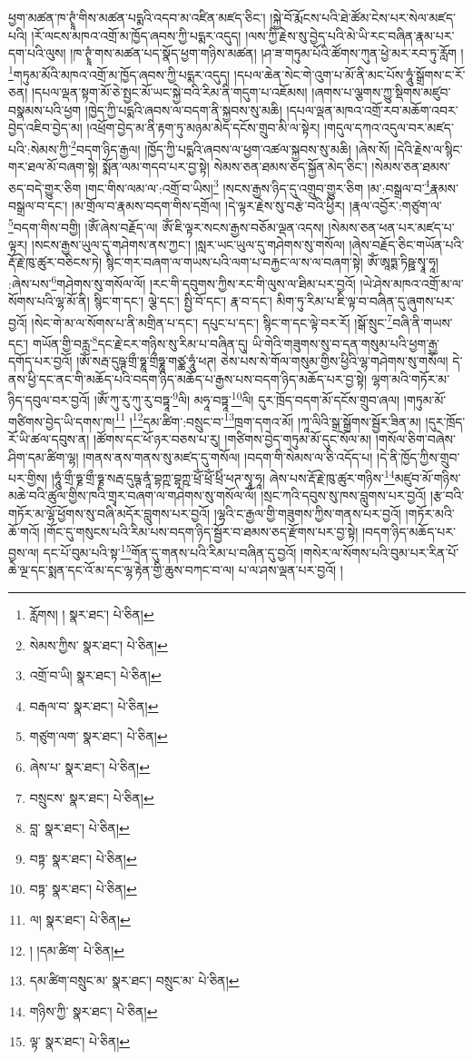 ཕྱག་མཚན་ཁ་ཊྭཱཾ་གིས་མཚན་པདྨའི་འདབ་མ་འཛིན་མཛད་ཅིང་། །སྐྱེ་བོ་རྨོངས་པའི་ཐེ་ཚོམ་ངེས་པར་སེལ་མཛད་པའི། །རོ་ལངས་མཁའ་འགྲོ་མ་ཁྱོད་ཞབས་ཀྱི་པདྨར་འདུད། །ལས་ཀྱི་རྗེས་སུ་བྱེད་པའི་མེ་ཡི་རང་བཞིན་རྣམ་པར་དག་པའི་ལུས། །ཁ་ཊྭཱཾ་གས་མཚན་པད་སྣོད་ཕྱག་གཉིས་མཚན། །ཤ་ཟ་གཏུམ་པོའི་ཚོགས་ཀུན་ཕྱེ་མར་རབ་ཏུ་རློག །\footnote{རློགས། །  སྣར་ཐང་།  པེ་ཅིན། }གཏུམ་མོའི་མཁའ་འགྲོ་མ་ཁྱོད་ཞབས་ཀྱི་པདྨར་འདུད། །དཔལ་ཆེན་སེང་གེ་འུག་པ་མོ་ནི་མང་པོས་ཧཱུཾ་སྒྲོགས་ང་རོ་ཅན། །དཔལ་ལྡན་སྟག་མོ་ཅེ་སྤྱང་མོ་ཡང་སྐྱེ་བའི་རིམ་ནི་གདུག་པ་འཇོམས། །ཞགས་པ་ལྕགས་ཀྱུ་སྡིགས་མཛུབ་བསྣམས་པའི་ཕྱག །ཁྱེད་ཀྱི་པདྨའི་ཞབས་ལ་བདག་ནི་སྐྱབས་སུ་མཆི། །དཔལ་ལྡན་མཁའ་འགྲོ་རབ་མཆོག་འབར་བྱེད་འཇིབ་བྱེད་མ། །འཕྲོག་བྱེད་མ་ནི་རྟག་ཏུ་མཉམ་མེད་དངོས་གྲུབ་མི་ལ་སྟེར། །གདུལ་དཀའ་འདུལ་བར་མཛད་པའི་:སེམས་ཀྱི་\footnote{སེམས་ཀྱིས་  སྣར་ཐང་།  པེ་ཅིན། }བདག་ཉིད་རྒྱལ། །ཁྱོད་ཀྱི་པདྨའི་ཞབས་ལ་ཕྱག་འཚལ་སྐྱབས་སུ་མཆི། །ཞེས་སོ། །དེའི་རྗེས་ལ་སྙིང་གར་ཐལ་མོ་བཞག་སྟེ། སྨོན་ལམ་གདབ་པར་བྱ་སྟེ། སེམས་ཅན་ཐམས་ཅད་སྐྱོན་མེད་ཅིང་། །སེམས་ཅན་ཐམས་ཅད་བདེ་གྱུར་ཅིག །གང་གིས་ལམ་ལ་:འགྲོ་བ་ཡིས།\footnote{འགྲོ་བ་ཡི།  སྣར་ཐང་།  པེ་ཅིན། } །སངས་རྒྱས་ཉིད་དུ་འགྲུབ་གྱུར་ཅིག །མ་:བསྒྲལ་བ་\footnote{བརྒལ་བ་  སྣར་ཐང་།  པེ་ཅིན། }རྣམས་བསྒྲལ་བ་དང་། །མ་གྲོལ་བ་རྣམས་བདག་གིས་དགྲོལ། །དེ་ལྟར་རྗེས་སུ་བརྩེ་བའི་ཕྱིར། །རྣལ་འབྱོར་:གཙུག་ལ་\footnote{གཙུག་ལག་  སྣར་ཐང་།  པེ་ཅིན། }བདག་གིས་བགྱི། །ཨོཾ་ཞེས་བརྗོད་ལ། ཨོཾ་ཇི་ལྟར་སངས་རྒྱས་བཅོམ་ལྡན་འདས། །སེམས་ཅན་ཕན་པར་མཛད་པ་ལྟར། །སངས་རྒྱས་ཡུལ་དུ་གཤེགས་ནས་ཀྱང་། །སླར་ཡང་ཡུལ་དུ་གཤེགས་སུ་གསོལ། །ཞེས་བརྗོད་ཅིང་གཡོན་པའི་རྡོ་རྗེ་ཁུ་ཚུར་བཅིངས་ཏེ། སྙིང་གར་བཞག་ལ་གཡས་པའི་ལག་པ་བརྐྱང་ལ་ས་ལ་བཞག་སྟེ། ཨོཾ་ཨཱཏྨ་ཏིཥྛ་སྭཱ་ཧཱ། :ཞེས་པས་\footnote{ཞེས་པ་  སྣར་ཐང་།  པེ་ཅིན། }གཤེགས་སུ་གསོལ་ལོ། །རང་གི་དབུགས་ཀྱིས་རང་གི་ལུས་ལ་ཐིམ་པར་བྱའོ། །ཡེ་ཤེས་མཁའ་འགྲོ་མ་ལ་སོགས་པའི་ལྷ་མོ་ནི། སྙིང་ག་དང་། ལྕེ་དང་། སྤྱི་བོ་དང་། རྣ་བ་དང་། མིག་ཏུ་རིམ་པ་ཇི་ལྟ་བ་བཞིན་དུ་ཞུགས་པར་བྱའོ། །སེང་གེ་མ་ལ་སོགས་པ་ནི་མགྲིན་པ་དང་། དཔུང་པ་དང་། སྙིང་ག་དང་ལྟེ་བར་རོ། །སྒོ་སྲུང་\footnote{བསྲུངས་  སྣར་ཐང་།  པེ་ཅིན། }བཞི་ནི་གཡས་དང་། གཡོན་གྱི་བརླ་\footnote{བླ་  སྣར་ཐང་།  པེ་ཅིན། }དང་རྗེ་ངར་གཉིས་སུ་རིམ་པ་བཞིན་དུ། ཡི་གེའི་གཟུགས་སུ་བ་དན་གསུམ་པའི་ཕྱག་རྒྱ་དགོད་པར་བྱའོ། །ཨོཾ་སརྦ་དུཥྚ་གྲྀ་ཧྞཱ་གྲྀཧྞཱ་གཙྪ་ཧཱུཾ་ཕཊ། ཅེས་པས་སེ་གོལ་གསུམ་གྱིས་ཕྱིའི་ལྷ་གཤེགས་སུ་གསོལ། དེ་ནས་ཕྱི་དང་ནང་གི་མཆོད་པའི་བདག་ཉིད་མཆོད་པ་རྒྱས་པས་བདག་ཉིད་མཆོད་པར་བྱ་སྟེ། ལྷག་མའི་གཏོར་མ་ཉིད་དབུལ་བར་བྱའོ། །ཨོཾ་ཀུ་རུ་ཀུ་རུ་བཏྟཱ་\footnote{བཏྟ་  སྣར་ཐང་།  པེ་ཅིན། }ལི། མཧཱ་བཏྟཱ་\footnote{བཏྟ་  སྣར་ཐང་།  པེ་ཅིན། }ལི། དུར་ཁྲོད་བདག་མོ་དངོས་གྲུབ་ཞལ། །གཏུམ་མོ་གཙིགས་བྱེད་ཡི་དགས་ཁ།\footnote{ལ།  སྣར་ཐང་།  པེ་ཅིན། } །\footnote{། །དམ་ཚིག་  པེ་ཅིན། }དམ་ཚིག་:བསྲུང་བ་\footnote{དམ་ཚིག་བསྲུང་མ་  སྣར་ཐང་། བསྲུང་མ་  པེ་ཅིན། }ཁྲག་དགའ་མོ། །ཀཱ་ལིའི་སྒྲ་སྒྲོགས་སྦྱོར་ཟིན་མ། །དུར་ཁྲོད་རོ་ཡི་ཚལ་དབུས་ན། །ཚོགས་དང་ཕོ་ཉར་བཅས་པ་རུ། །གཙིགས་བྱེད་གཏུམ་མོ་དུང་སོལ་མ། །གསོལ་ཅིག་བཞེས་ཤིག་དམ་ཚིག་ལྷ། །གནས་ནས་གནས་སུ་མཛད་དུ་གསོལ། །བདག་གི་སེམས་ལ་ཅི་འདོད་པ། །དེ་ནི་ཁྱོད་ཀྱིས་གྲུབ་པར་གྱིས། །ཧཱུཾ་གྲྀ་ཧྞ་གྲྀ་ཧྞ་སརྦ་དུཥྚ་ནཱཾ་བྷཀྵ་བྷཀྵ་ཕྲོཾ་ཕྲོཾ་ཕྲིཾ་ཕཊ་སྭཱ་ཧཱ། ཞེས་པས་རྡོ་རྗེ་ཁུ་ཚུར་གཉིས་\footnote{གཉིས་ཀྱི་  སྣར་ཐང་།  པེ་ཅིན། }མཛུབ་མོ་གཉིས་མཆེ་བའི་ཚུལ་གྱིས་ཁའི་གྲྭར་བཞག་ལ་གཤེགས་སུ་གསོལ་ལོ། །སྲང་ཀའི་དབུས་སུ་ཁས་བླུགས་པར་བྱའོ། །རྩ་བའི་གཏོར་མ་ལྷོ་ཕྱོགས་སུ་བཞི་མདོར་བླུགས་པར་བྱའོ། །ལྷའི་ང་རྒྱལ་གྱི་གཟུགས་ཀྱིས་གནས་པར་བྱའོ། །གཏོར་མའི་ཆོ་གའོ། །གོང་དུ་གསུངས་པའི་རིམ་པས་བདག་ཉིད་སྦྱོར་བ་ཐམས་ཅད་རྫོགས་པར་བྱ་སྟེ། །བདག་ཉིད་མཆོད་པར་བྱས་ལ། དང་པོ་བུམ་པའི་སྟ་\footnote{ལྟ་  སྣར་ཐང་།  པེ་ཅིན། }གོན་དུ་གནས་པའི་རིམ་པ་བཞིན་དུ་བྱའོ། །གསེར་ལ་སོགས་པའི་བུམ་པར་རིན་པོ་ཆེ་ལྔ་དང་སྨན་དང་འོ་མ་དང་ལྷ་རྟེན་གྱི་ཆུས་བཀང་བ་ལ། པ་ལ་ཤས་ལྡན་པར་བྱའོ། །
